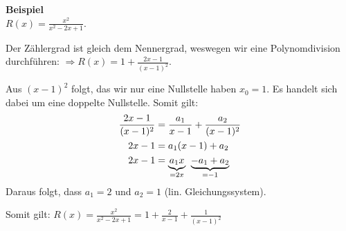 \textbf{Beispiel}\\
$R(x) = \frac{x^2}{x^2-2x+1}$.

Der Zählergrad ist gleich dem Nennergrad,
weswegen wir eine Polynomdivision durchführen: $\Rightarrow R(x) = 1 +
\frac{2x-1}{(x-1)^2}$.

Aus $(x-1)^2$ folgt, das wir nur eine Nullstelle haben $x_0 = 1$. Es handelt
sich dabei um eine doppelte Nullstelle. Somit gilt:
\begin{align*}
\frac{2x-1}{(x-1)^2} &= \frac{a_1}{x-1} + \frac{a_2}{(x-1)^2}\\
2x-1 &= a_1(x-1) + a_2\\
2x-1 &= \underset{= 2x}{\underbrace{a_1 x}} \;\; \underset{= -1 }{\underbrace{- a_1 + a_2}}
\end{align*}
Daraus folgt, dass $a_1 = 2$ und $a_2 = 1$ (lin. Gleichungssystem).

Somit gilt: $R(x) = \frac{x^2}{x^2-2x+1} = 1 + \frac{2}{x-1} +
\frac{1}{(x-1)^2}$
